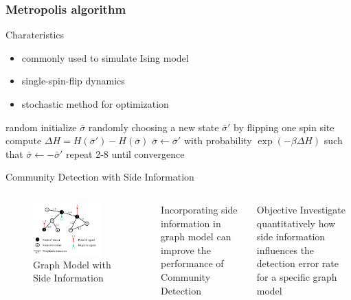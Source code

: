 \documentclass[notheorems]{beamer}
\begin{document}
\begin{frame}
\frametitle{Metropolis algorithm}
\begin{block}{Charateristics}
\begin{itemize}
	\item commonly used to simulate Ising model
	\item single-spin-flip dynamics 
	\item stochastic method for optimization
\end{itemize}
\end{block}
	\begin{algorithmic}[1]
	\STATE random initialize $\bar{\sigma}$
	\STATE randomly choosing a new state $\bar{\sigma}'$ by flipping one spin site
	\STATE compute $\Delta H= H(\bar{\sigma}') - H(\bar{\sigma})$
	\STATE $\bar{\sigma} \leftarrow \bar{\sigma}'$
	\ELSE
	\STATE with probability $\exp(-\beta \Delta H)$ 
	such that $\bar{\sigma} \leftarrow -\bar{\sigma}'$ 
	\ENDIF
	\STATE repeat 2-8 until convergence
\end{algorithmic}
\end{frame}

\begin{frame}{Community Detection with Side Information}
	\begin{columns}
	\begin{figure}
		\includegraphics[width=0.8\textwidth]{si.png}
		\caption{\scriptsize Graph Model with Side Information}
	\end{figure}
	Incorporating side information in graph model
	can improve the performance of Community Detection
	\begin{block}{Objective}
		Investigate quantitatively how side information influences
		the detection error rate for a specific graph model
	\end{block}
	\end{columns}
\end{frame}
\end{document}
